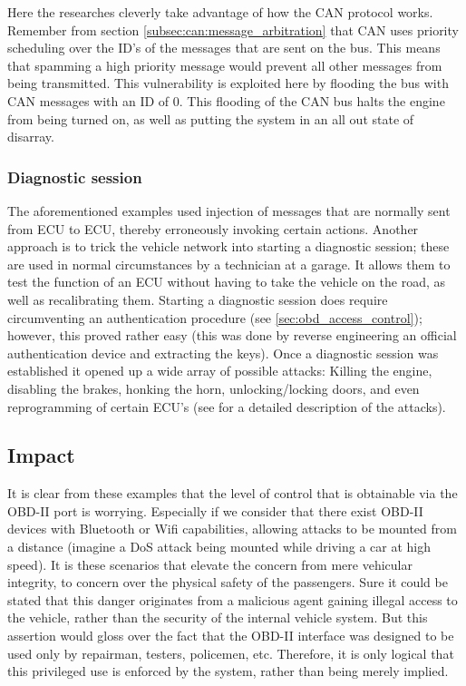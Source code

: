 Here the researches cleverly take advantage of how the CAN protocol works. Remember from section \ref{subsec:can:message_arbitration} that CAN uses priority scheduling over the ID's of the messages that are sent on the bus. This means that spamming a high priority message would prevent all other messages from being transmitted. This vulnerability is exploited here by flooding the bus with CAN messages with an ID of 0. This flooding of the CAN bus halts the engine from being turned on, as well as putting the system in an all out state of disarray.

\subsubsection{Diagnostic session} 
\label{subsubsec:diagnostic_session}

The aforementioned examples used injection of messages that are normally sent from ECU to ECU, thereby erroneously invoking certain actions. Another approach is to trick the vehicle network into starting a diagnostic session; these are used in normal circumstances by a technician at a garage. It allows them to test the function of an ECU without having to take the vehicle on the road, as well as recalibrating them. Starting a diagnostic session does require circumventing an authentication procedure (see \ref{sec:obd_access_control}); however, this proved rather easy (this was done by reverse engineering an official authentication device and extracting the keys). Once a diagnostic session was established it opened up a wide array of possible attacks: Killing the engine, disabling the brakes, honking the horn, unlocking/locking doors, and even reprogramming of certain ECU's (see \cite{MillerC} for a detailed description of the attacks).

\subsection{Impact}
\label{subsec:impact}

It is clear from these examples that the level of control that is obtainable via the OBD-II port is worrying. Especially if we consider that there exist OBD-II devices with Bluetooth or Wifi capabilities, allowing attacks to be mounted from a distance (imagine a DoS attack being mounted while driving a car at high speed). It is these scenarios that elevate the concern from mere vehicular integrity, to concern over the physical safety of the passengers. Sure it could be stated that this danger originates from a malicious agent gaining illegal access to the vehicle, rather than the security of the internal vehicle system. But this assertion would gloss over the fact that the OBD-II interface was designed to be used only by repairman, testers, policemen, etc. Therefore, it is only logical that this privileged use is enforced by the system, rather than being merely implied.

